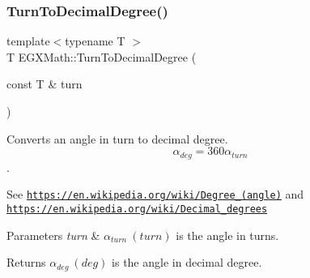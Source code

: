 \subsubsection{\texorpdfstring{Turn\+To\+Decimal\+Degree()}{TurnToDecimalDegree()}}
{\footnotesize\ttfamily template$<$typename T $>$ \\
T E\+G\+X\+Math\+::\+Turn\+To\+Decimal\+Degree (\begin{DoxyParamCaption}\item[{const T \&}]{turn }\end{DoxyParamCaption})}



Converts an angle in turn to decimal degree. \[\alpha_{deg}=360\alpha_{turn}\]. 

See \href{https://en.wikipedia.org/wiki/Degree_(angle)}{\tt https\+://en.\+wikipedia.\+org/wiki/\+Degree\+\_\+(angle)} and \href{https://en.wikipedia.org/wiki/Decimal_degrees}{\tt https\+://en.\+wikipedia.\+org/wiki/\+Decimal\+\_\+degrees} 
\begin{DoxyParams}{Parameters}
{\em turn} & $\alpha_{turn}\ (turn)$ is the angle in turns. \\
\hline
\end{DoxyParams}
\begin{DoxyReturn}{Returns}
$\alpha_{deg}\ (deg)$ is the angle in decimal degree. 
\end{DoxyReturn}
